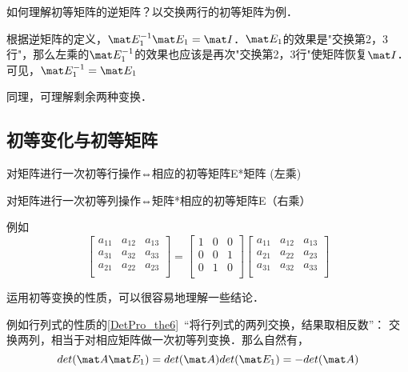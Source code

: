 \begin{example}{}
如何理解初等矩阵的逆矩阵？以交换两行的初等矩阵为例．

根据逆矩阵的定义，$\mat E_1^{-1} \mat E_1 = \mat I$．$\mat E_1$的效果是"交换第2，3行"，那么左乘的$\mat E_1^{-1}$的效果也应该是再次"交换第2，3行"使矩阵恢复$\mat I$．可见，$\mat E_1^{-1} =  \mat E_1$

同理，可理解剩余两种变换．
\end{example}

\subsection{初等变化与初等矩阵}
\begin{theorem}{}
对矩阵进行一次初等行操作⇔相应的初等矩阵E*矩阵 (左乘)

对矩阵进行一次初等列操作⇔矩阵*相应的初等矩阵E（右乘）
\end{theorem}

\begin{example}{}
例如
\begin{equation}
\begin{bmatrix}
    a_{11} & a_{12} & a_{13}\\
    a_{31} & a_{32} & a_{33}\\
    a_{21} & a_{22} & a_{23}\\
\end{bmatrix}
=
    \begin{bmatrix}
        1 & 0 & 0\\
        0 & 0 & 1\\
        0 & 1 & 0\\
    \end{bmatrix}
\begin{bmatrix}
        a_{11} & a_{12} & a_{13}\\
        a_{21} & a_{22} & a_{23}\\
        a_{31} & a_{32} & a_{33}\\
\end{bmatrix}
\end{equation}
\end{example}

运用初等变换的性质，可以很容易地理解一些结论．

\begin{example}{}
例如行列式的性质的\autoref{DetPro_the6}~“将行列式的两列交换，结果取相反数”： 交换两列，相当于对相应矩阵做一次初等列变换．那么自然有，
$$det (\mat A \mat E_1)=det (\mat A) det(\mat E_1)=-det (\mat A)$$
\end{example}

